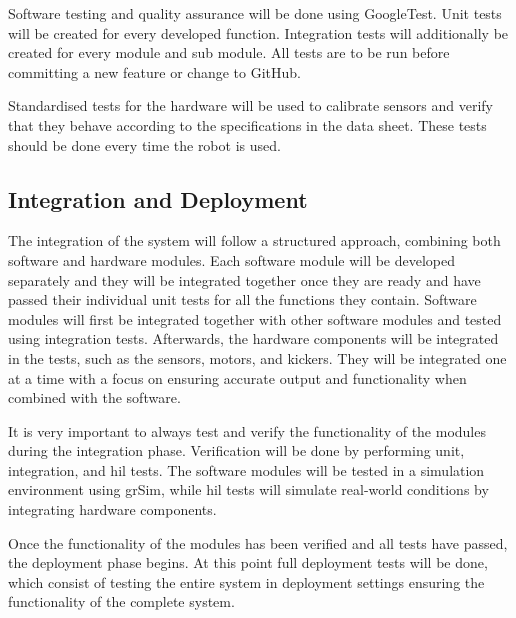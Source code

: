 Software testing and quality assurance will be done using GoogleTest. Unit tests will be created for every developed function. Integration tests will additionally be created for every module and sub module. All tests are to be run before committing a new feature or change to GitHub.

Standardised tests for the hardware will be used to calibrate sensors and verify that they behave according to the specifications in the data sheet. These tests should be done every time the robot is used.



\subsection{Integration and Deployment}
\label{subsection:integration_and_deployment}

The integration of the system will follow a structured approach, combining both software and hardware modules. 
Each software module will be developed separately and they will be integrated together once they are ready and have passed their individual unit tests for all the functions they contain. Software modules will first be integrated together with other software modules and tested using integration tests. Afterwards, the hardware components will be integrated in the tests, such as the sensors, motors, and kickers. They will be integrated one at a time with a focus on ensuring accurate output and functionality when combined with the software. 

It is very important to always test and verify the functionality of the modules during the integration phase. Verification will be done by performing unit, integration, and \ac{hil} tests. 
The software modules will be tested in a simulation environment using grSim, while \ac{hil} tests will simulate real-world conditions by integrating hardware components. 

Once the functionality of the modules has been verified and all tests have passed, the deployment phase begins. At this point full deployment tests will be done, which consist of testing the entire system in deployment settings ensuring the functionality of the complete system.



